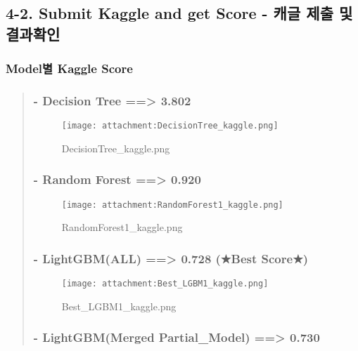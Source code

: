 \documentclass[11pt]{article}
\makeatletter
\def\maxwidth{\ifdim\Gin@nat@width>\linewidth\linewidth
    \else\Gin@nat@width\fi}
\let\Oldincludegraphics\includegraphics
\renewcommand{\includegraphics}[1]{\Oldincludegraphics[width=.8\maxwidth]{#1}}
\makeatother
\begin{document}
    \subsection{4-2. Submit Kaggle and get Score - 캐글 제출 및
결과확인}\label{submit-kaggle-and-get-score---uxce90uxae00-uxc81cuxcd9c-uxbc0f-uxacb0uxacfcuxd655uxc778}

\subsubsection{Model별 Kaggle Score}\label{modeluxbcc4-kaggle-score}

\begin{quote}
\subsubsection{- Decision Tree ==\textgreater{}
3.802}\label{decision-tree-3.802}

\begin{figure}
\centering
\texttt{[image: attachment:DecisionTree\_kaggle.png]}
\caption{DecisionTree\_kaggle.png}
\end{figure}

\subsubsection{- Random Forest ==\textgreater{}
0.920}\label{random-forest-0.920}

\begin{figure}
\centering
\texttt{[image: attachment:RandomForest1\_kaggle.png]}
\caption{RandomForest1\_kaggle.png}
\end{figure}

\subsubsection{- LightGBM(ALL) ==\textgreater{} 0.728 (★Best
Score★)}\label{lightgbmall-0.728-best-score}

\begin{figure}
\centering
\texttt{[image: attachment:Best\_LGBM1\_kaggle.png]}
\caption{Best\_LGBM1\_kaggle.png}
\end{figure}

\subsubsection{- LightGBM(Merged Partial\_Model) ==\textgreater{}
0.730}\label{lightgbmmerged-partial_model-0.730}


\end{quote}
\end{document}
